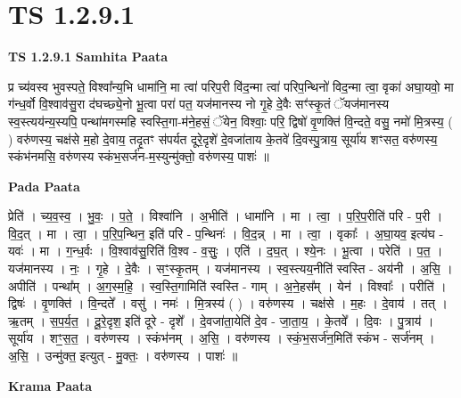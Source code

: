 \documentclass[17pt]{extarticle}
\begin{document}
\section{ TS 1.2.9.1 }

\textbf{TS 1.2.9.1 } \newline
\textbf{Samhita Paata} \newline

प्र च्य॑वस्व भुवस्पते॒ विश्वा᳚न्य॒भि धामा॑नि॒ मा त्वा॑ परिप॒री वि॑द॒न्मा त्वा॑ परिप॒न्थिनो॑ विद॒न्मा त्वा॒ वृका॑ अघा॒यवो॒ मा ग॑न्ध॒र्वो वि॒श्वाव॑सु॒रा द॑घच्छ्ये॒नो भू॒त्वा परा॑ पत॒ यज॑मानस्य नो गृ॒हे दे॒वैः सꣳ॑स्कृ॒तं ॅयज॑मानस्य स्व॒स्त्यय॑न्य॒स्यपि॒ पन्था॑मगस्महि स्वस्ति॒गा-म॑ने॒हसं॒ ॅयेन॒ विश्वाः॒ परि॒ द्विषो॑ वृ॒णक्ति॑ वि॒न्दते॒ वसु॒ नमो॑ मि॒त्रस्य॒ ( ) वरु॑णस्य॒ चक्ष॑से म॒हो दे॒वाय॒ तदृ॒तꣳ स॑पर्यत दूरे॒दृशे॑ दे॒वजा॑ताय के॒तवे॑ दि॒वस्पु॒त्राय॒ सूर्या॑य शꣳसत॒ वरु॑णस्य॒ स्कंभ॑नमसि॒ वरु॑णस्य स्कंभ॒सर्ज॑न-म॒स्युन्मु॑क्तो॒ वरु॑णस्य॒ पाशः॑ ॥ \newline

\textbf{Pada Paata} \newline

प्रेति॑ । च्य॒व॒स्व॒ । भु॒वः॒ । प॒ते॒ । विश्वा॑नि । अ॒भीति॑ । धामा॑नि । मा । त्वा॒ । प॒रि॒प॒रीति॑ परि - प॒री । वि॒द॒त् । मा । त्वा॒ । प॒रि॒प॒न्थिन॒ इति॑ परि - प॒न्थिनः॑ । वि॒द॒न्न् । मा । त्वा॒ । वृकाः᳚ । अ॒घा॒यव॒ इत्य॑घ - यवः॑ । मा । ग॒न्ध॒र्वः । वि॒श्वाव॑सु॒रिति॑ वि॒श्व - व॒सुः॒ । एति॑ । द॒घ॒त् । श्ये॒नः । भू॒त्वा । परेति॑ । प॒त॒ । यज॑मानस्य । नः॒ । गृ॒हे । दे॒वैः । सꣳ॒॒स्कृ॒तम् । यज॑मानस्य । स्व॒स्त्यय॒नीति॑ स्वस्ति - अय॑नी । अ॒सि॒ । अपीति॑ । पन्था᳚म् । अ॒ग॒स्म॒हि॒ । स्व॒स्ति॒गामिति॑ स्वस्ति - गाम् । अ॒ने॒हस᳚म् । येन॑ । विश्वाः᳚ । परीति॑ । द्विषः॑ । वृ॒णक्ति॑ । वि॒न्दते᳚ । वसु॑ । नमः॑ । मि॒त्रस्य॑ ( ) । वरु॑णस्य । चक्ष॑से । म॒हः । दे॒वाय॑ । तत् । ऋ॒तम् । स॒प॒र्य॒त॒ । दू॒रे॒दृश॒ इति॑ दूरे - दृशे᳚ । दे॒वजा॑ता॒येति॑ दे॒व - जा॒ता॒य॒ । के॒तवे᳚ । दि॒वः । पु॒त्राय॑ । सूर्या॑य । शꣳ॒॒स॒त॒ । वरु॑णस्य । स्कंभ॑नम् । अ॒सि॒ । वरु॑णस्य । स्कं॒भ॒सर्ज॑न॒मिति॑ स्कंभ - सर्ज॑नम् । अ॒सि॒ । उन्मु॑क्त॒ इत्युत् - मु॒क्तः॒ । वरु॑णस्य । पाशः॑ ॥  \newline


\textbf{Krama Paata} \newline
\end{document}
